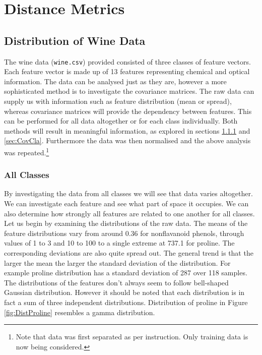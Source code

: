 \documentclass[10pt,twocolumn,letterpaper]{article}
\begin{document}
\section{Distance Metrics}
\subsection{Distribution of Wine Data}

The wine data ({\tt\small wine.csv}) provided consisted of three classes of feature vectors. Each feature vector is made up of 13 features representing chemical and optical information. The data can be analysed just as they are, however a more sophisticated method is to investigate the covariance matrices. The raw data can supply us with information such as feature distribution (mean or spread), whereas covariance matrices will provide the dependency between features. This can be performed for all data altogether or for each class individually. Both methods will result in meaningful information, as explored in sections \ref{sec:CovAll} and \ref{sec:CovCla}. Furthermore the data was then normalised and the above analysis was repeated.\footnote{Note that data was first separated as per instruction. Only training data is now being considered.} 

\vspace{-3mm}

\subsubsection{All Classes} \label{sec:CovAll}

\indent \indent By investigating the data from all classes we will see that data varies altogether. We can investigate each feature and see what part of space it occupies. We can also determine how strongly all features are related to one another for all classes. Let us begin by examining the distributions of the raw data. The means of the feature distributions vary from around 0.36 for nonflavanoid phenols, through values of 1 to 3 and 10 to 100 to a single extreme at 737.1 for proline. The corresponding deviations are also quite spread out. The general trend is that the larger the mean the larger the standard deviation of the distribution. For example proline distribution has a standard deviation of 287 over 118 samples. The distributions of the features don't always seem to follow bell-shaped Gaussian distribution. However it should be noted that each distribution is in fact a sum of three independent distributions. Distribution of proline in Figure \ref{fig:DistProline} resembles a gamma distribution.
\end{document}

